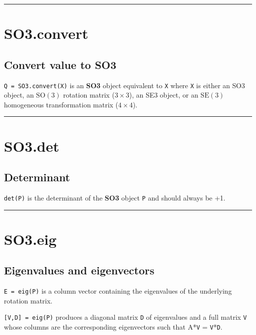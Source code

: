 \vspace{1.5ex}\hrule

\hypertarget{SO3.convert}{\section*{SO3.convert}}
\subsection*{Convert value to SO3}


\texttt{Q = SO3.convert(X)} is an \textbf{\color{red} SO3} object equivalent to \texttt{X} where \texttt{X} is either
an SO3 object, an $\mbox{SO}(3)$ rotation matrix ($3 \times 3$), an SE3 object, or an
$\mbox{SE}(3)$ homogeneous transformation matrix ($4 \times 4$).

\vspace{1.5ex}\hrule

\hypertarget{SO3.det}{\section*{SO3.det}}
\subsection*{Determinant}


\texttt{det(P)} is the determinant of the \textbf{\color{red} SO3} object \texttt{P} and should always be +1.

\vspace{1.5ex}\hrule

\hypertarget{SO3.eig}{\section*{SO3.eig}}
\subsection*{Eigenvalues and eigenvectors}


\texttt{E = eig(P)} is a column vector containing the eigenvalues of the
underlying rotation matrix.



\texttt{[V,D] = eig(P)} produces a diagonal matrix \texttt{D} of eigenvalues and
a full matrix \texttt{V} whose columns are the corresponding eigenvectors
such that A*\texttt{V} = \texttt{V}*\texttt{D}.


